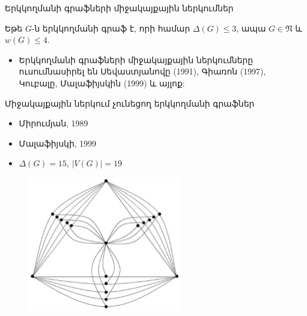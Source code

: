 \begin{frame}[shrink]{Երկկողմանի գրաֆների միջակայքային ներկումներ}
\begin{theorem}[Հանսեն, 1992] Եթե $G$-ն երկկողմանի գրաֆ է, որի համար 
$\Delta(G)\leq 3$, ապա $G\in \mathfrak{N}$ և $w(G)\leq 4$.
\end{theorem}

\begin{itemize}
\item Երկկողմանի գրաֆների միջակայքային ներկումները ուսումնասիրել են Սեվաստյանովը (1991), Գիառոն (1997), Կուբալը, Մալաֆիյսկին (1999) և այլոք:
\end{itemize}



\end{frame}

\begin{frame}{Միջակայքային ներկում չունեցող երկկողմանի գրաֆներ}
\begin{itemize}
\item Միրումյան, 1989
\item Մալաֆիյսկի, 1999
\item $\Delta(G)=15$, $|V(G)| = 19$
\end{itemize}
\begin{figure}[h]
\begin{center}
\includegraphics[width=0.6\textwidth]{figures/shannon555.eps}
\end{center}
\end{figure}
\end{frame}


